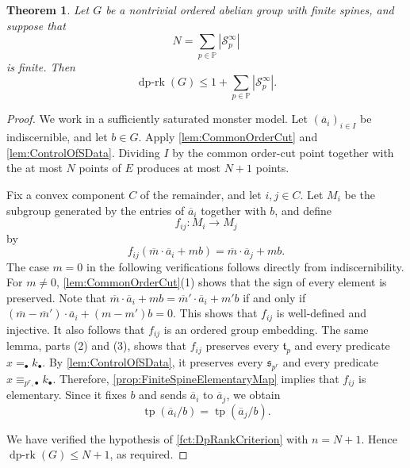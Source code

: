 \documentclass{article}
\theoremstyle{definition}
\theoremstyle{remark}
\theoremstyle{plain}
\newtheorem{thm}[dfn]{Theorem}
\begin{document}
\begin{thm}\label{thm:UpperBoundFiniteSpines}
	Let $G$ be a nontrivial ordered abelian group with finite spines, and suppose that
	\[
		N
		=
		\sum_{p\in\mathbb{P}}
		\left|\mathcal{S}_p^\infty\right|
	\]
	is finite.
	Then
	\[
		\operatorname{dp\text{-}rk}(G)
		\leq
		1+
		\sum_{p\in\mathbb{P}}
		\left|\mathcal{S}_p^\infty\right|.
	\]
\end{thm}

\begin{proof}
	We work in a sufficiently saturated monster model.
	Let $(\overline{a}_i)_{i\in I}$ be indiscernible, and let $b\in G$.
	Apply \autoref{lem:CommonOrderCut} and \autoref{lem:ControlOfSData}.
	Dividing $I$ by the common order-cut point together with the at most $N$ points of $E$ produces at most $N+1$ points.

	Fix a convex component $C$ of the remainder, and let $i,j\in C$.
	Let $M_i$ be the subgroup generated by the entries of $\overline{a}_i$ together with $b$, and define
	\[
		f_{ij}:M_i
		\longrightarrow
		M_j
	\]
	by
	\[
		f_{ij}
		\left(
			\overline{m}\cdot\overline{a}_i+mb
		\right)
		=
		\overline{m}\cdot\overline{a}_j+mb.
	\]
	The case $m=0$ in the following verifications follows directly from indiscernibility.
	For $m\neq0$, \autoref{lem:CommonOrderCut}(1) shows that the sign of every element is preserved.
	Note that $\overline{m}\cdot\overline{a}_i+mb = \overline{m}'\cdot\overline{a}_i+m'b$ if and only if $(\overline{m} - \overline{m}')\cdot\overline{a}_i+(m - m')b = 0$.
	This shows that $f_{ij}$ is well-defined and injective.
	It also follows that $f_{ij}$ is an ordered group embedding.
	The same lemma, parts (2) and (3), shows that $f_{ij}$ preserves every $\mathfrak{t}_p$ and every predicate $x=_{\bullet}k_{\bullet}$.
	By \autoref{lem:ControlOfSData}, it preserves every $\mathfrak{s}_{p^r}$ and every predicate $x\equiv_{p^r,\bullet}k_{\bullet}$.
	Therefore, \autoref{prop:FiniteSpineElementaryMap} implies that $f_{ij}$ is elementary.
	Since it fixes $b$ and sends $\overline{a}_i$ to $\overline{a}_j$, we obtain
	\[
		\operatorname{tp}(\overline{a}_i/b)
		=
		\operatorname{tp}(\overline{a}_j/b).
	\]

	We have verified the hypothesis of \autoref{fct:DpRankCriterion} with $n=N+1$.
	Hence $\operatorname{dp\text{-}rk}(G)\leq N+1$, as required.
\end{proof}

\begin{sloppypar}
	\printbibliography
\end{sloppypar}
\end{document}

